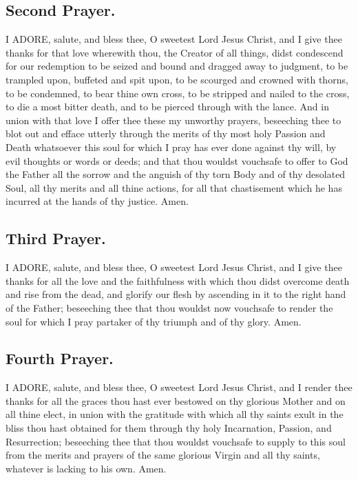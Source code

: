 \documentclass[a5paper,12pt]{memoir}
\begin{document}
\subsection{Second Prayer.} 

I ADORE, salute, and 
bless thee, O sweetest Lord Jesus Christ, 
and I give thee thanks 
for that love wherewith thou, the Creator 
of all things, didst 
condescend for our 
redemption to be seized and bound and 
dragged away to judgment, to be trampled 
upon, buffeted and 
spit upon, to be scourged and crowned with 
thorns, to be condemned, to bear thine own 
cross, to be stripped 
and nailed to the cross, 
to die a most bitter 
death, and to be pierced through with the 
lance. And in union 
with that love I offer 
thee these my unworthy prayers, beseeching thee to blot out and 
efface utterly through 
the merits of thy most 
holy Passion and Death 
whatsoever this soul 
for which I pray has 
ever done against thy 
will, by evil thoughts 
or words or deeds; 
and that thou wouldst 
vouchsafe to offer to 
God the Father all the 
sorrow and the anguish of thy torn Body 
and of thy desolated 
Soul, all thy merits 
and all thine actions, 
for all that chastisement which he has incurred at the hands of 
thy justice. Amen. 

\subsection{Third Prayer.}

I ADORE, salute, and 
bless thee, O sweetest Lord Jesus Christ, 
and I give thee thanks 
for all the love and 
the faithfulness with 
which thou didst overcome death and rise 
from the dead, and 
glorify our flesh by 
ascending in it to the 
right hand of the Father; beseeching thee 
that thou wouldst now 
vouchsafe to render 
the soul for which I 
pray partaker of thy 
triumph and of thy 
glory. Amen. 

\subsection{Fourth Prayer.}

I ADORE, salute, 
and bless thee, O 
sweetest Lord Jesus 
Christ, and I render 
thee thanks for all 
the graces thou hast 
ever bestowed on thy 
glorious Mother and 
on all thine elect, in 
union with the gratitude with which all 
thy saints exult in the 
bliss thou hast obtained for them through 
thy holy Incarnation, 
Passion, and Resurrection; beseeching 
thee that thou wouldst 
vouchsafe to supply 
to this soul from the 
merits and prayers of 
the same glorious Virgin and all thy saints, 
whatever is lacking to 
his own. Amen. 
\end{document}
